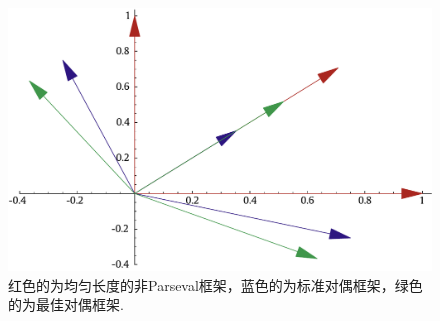 \documentclass[cn,11pt,a4paper,founder]{elegantpaper}
\begin{document}
\begin{figure}[h]
  \centering
  \includegraphics[scale=0.55]{image/frames.pdf}
  \caption{红色的为均匀长度的非Parseval框架，蓝色的为标准对偶框架，绿色的为最佳对偶框架.}
  \label{fig:3.1}
\end{figure}
\end{document}
